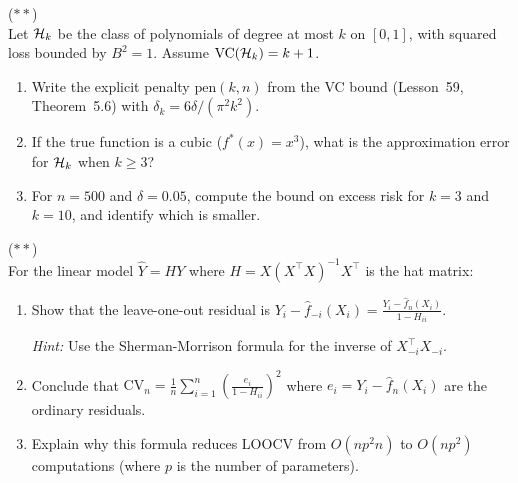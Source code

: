 \documentclass[11pt,a4paper]{article}
\begin{document}
\begin{exercise}
\textnormal{(\(\ast\ast\))} \\
Let $\mathcal{H}_k$ be the class of polynomials of degree at most $k$ on
$[0, 1]$, with squared loss bounded by $B^2 = 1$.  Assume
$\operatorname{VC}(\mathcal{H}_k) = k + 1$.
\begin{enumerate}[nosep,label=(\alph*)]
    \item Write the explicit penalty $\mathrm{pen}(k, n)$ from
    the VC bound (Lesson~59, Theorem~5.6) with $\delta_k =
    6\delta/(\pi^2 k^2)$.
    \item If the true function is a cubic ($f^*(x) = x^3$), what
    is the approximation error for $\mathcal{H}_k$ when $k \geq 3$?
    \item For $n = 500$ and $\delta = 0.05$, compute the bound on
    excess risk for $k = 3$ and $k = 10$, and identify which is
    smaller.
\end{enumerate}
\end{exercise}

\begin{exercise}
\textnormal{(\(\ast\ast\))} \\
For the linear model $\hat{Y} = H Y$ where $H = X(X^\top X)^{-1}
X^\top$ is the hat matrix:
\begin{enumerate}[nosep,label=(\alph*)]
    \item Show that the leave-one-out residual is
    $Y_i - \hat{f}_{-i}(X_i) = \frac{Y_i - \hat{f}_n(X_i)}
    {1 - H_{ii}}$.

    \textit{Hint:} Use the Sherman-Morrison formula for the inverse
    of $X_{-i}^\top X_{-i}$.
    \item Conclude that $\mathrm{CV}_n = \frac{1}{n}\sum_{i=1}^n
    \left(\frac{e_i}{1 - H_{ii}}\right)^2$ where
    $e_i = Y_i - \hat{f}_n(X_i)$ are the ordinary residuals.
    \item Explain why this formula reduces LOOCV from $O(np^2 n)$
    to $O(np^2)$ computations (where $p$ is the number of
    parameters).
\end{enumerate}
\end{exercise}
\end{document}
